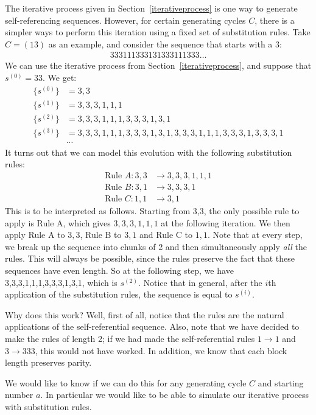 \documentclass[runningheads,a4paper]{llncs}
\begin{document}
The iterative process given in Section~\ref{iterativeprocess} is one way to generate self-referencing sequences. However, for certain generating cycles $C$, there is a simpler ways to perform this iteration using a fixed set of substitution rules. Take $C = (1 3)$ as an example, and consider the sequence that starts with a 3:
\begin{align*}
333111333131333111333\dots
\end{align*}
We can use the iterative process from Section~\ref{iterativeprocess}, and suppose that $s^{(0)} = 33$. We get:
\begin{align*}
\{s^{(0)}\} &= 3,3\\
\{s^{(1)}\} &= 3,3,3,1,1,1\\
\{s^{(2)}\} &= 3,3,3,1,1,1,3,3,3,1,3,1\\
\{s^{(3)}\} &= 3,3,3,1,1,1,3,3,3,1,3,1,3,3,3,1,1,1,3,3,3,1,3,3,3,1\\
&\cdots
\end{align*}
It turns out that we can model this evolution with the following substitution rules:
\begin{align*}
\text{Rule }A: 3,3 &\to 3,3,3,1,1,1 \\
\text{Rule }B: 3,1 &\to 3,3,3,1\\
\text{Rule }C: 1,1 &\to 3,1
\end{align*}
This is to be interpreted as follows. Starting from 3,3, the only possible rule to apply is Rule A, which gives $3,3,3,1,1,1$ at the following iteration. We then apply Rule A to $3,3$, Rule B to $3,1$ and Rule C to $1,1$. Note that at every step, we break up the sequence into chunks of 2 and then simultaneously apply \emph{all} the rules. This will always be possible, since the rules preserve the fact that these sequences have even length. So at the following step, we have 3,3,3,1,1,1,3,3,3,1,3,1, which is $s^{(2)}$. Notice that in general, after the $i$th application of the substitution rules, the sequence is equal to $s^{(i)}$.

Why does this work? Well, first of all, notice that the rules are the natural applications of the self-referential sequence. Also, note that we have decided to make the rules of length 2; if we had made the self-referential rules $1 \rightarrow 1$ and $3 \rightarrow 333$, this would not have worked. In addition, we know that each block length preserves parity. 

We would like to know if we can do this for any generating cycle $C$ and starting number $a$. In particular we would like to be able to simulate our iterative process with substitution rules.
\end{document}
